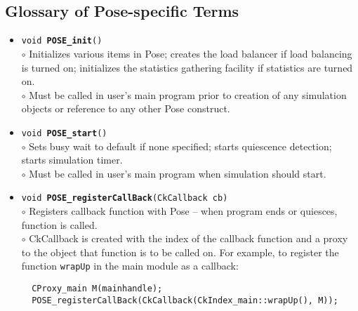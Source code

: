 \documentclass[10pt]{article}
\newcommand{\pose}{{\sc Pose}}
\begin{document}
~\\
\\

\subsection{Glossary of \pose{}-specific Terms}

\begin{itemize}
\item {\tt void {\bf POSE\_init}()}\\
	$\circ$ Initializes various items in \pose{}; creates the load balancer
	if load balancing is turned on; initializes the statistics
	gathering facility if statistics are turned on.\\
	$\circ$ Must be called in user's main program prior to creation of any
	simulation objects or reference to any other \pose{} construct.
\item {\tt void {\bf POSE\_start}()}\\
	$\circ$ Sets busy wait to default if none specified; starts
	quiescence detection; starts simulation timer.\\
	$\circ$ Must be called in user's main program when simulation
	should start.
\item {\tt void {\bf POSE\_registerCallBack}(CkCallback cb)}\\
	$\circ$ Registers callback function with \pose{} -- when program
	ends or quiesces, function is called.\\
	$\circ$ CkCallback is created with the index of the callback
	function and a proxy to the object that function is to be
	called on.  For example, to register the function {\tt wrapUp}
	in the main module as a callback:

\begin{verbatim}
  CProxy_main M(mainhandle);
  POSE_registerCallBack(CkCallback(CkIndex_main::wrapUp(), M));
\end{verbatim}


\end{itemize}
\end{document}
